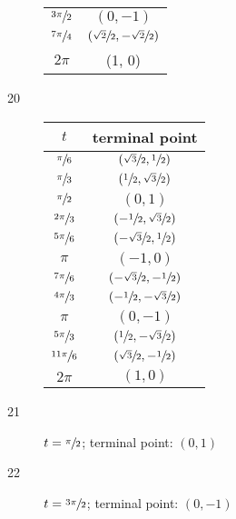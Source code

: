 \documentclass{exam}
\begin{document}
\begin{description}
\begin{tabular}{cc}
          $\sfrac{3 \pi}{2}$ & $\left( 0, -1 \right)$ \\
          $\sfrac{7 \pi}{4}$ & $\left( \sfrac{\sqrt{2}}{2}, -\sfrac{\sqrt{2}}{2} \right)$ \\
          $2 \pi$ & (1, 0) \\
          \bottomrule
        \end{tabular}

      \item[20]
        \begin{tabular}{cc}
          \toprule
          $t$ & terminal point \\
          \midrule
          $\sfrac{\pi}{6}$ & $\left( \sfrac{\sqrt{3}}{2}, \sfrac{1}{2} \right)$ \\
          $\sfrac{\pi}{3}$ & $\left( \sfrac{1}{2}, \sfrac{\sqrt{3}}{2} \right)$ \\

          \midrule
          $\sfrac{\pi}{2}$   & $(0, 1)$ \\
          $\sfrac{2 \pi}{3}$ & $\left( -\sfrac{1}{2}, \sfrac{\sqrt{3}}{2} \right)$ \\
          $\sfrac{5 \pi}{6}$ & $\left( -\sfrac{\sqrt{3}}{2}, \sfrac{1}{2} \right)$ \\

          \midrule
          $\pi$             & $(-1, 0)$ \\
          $\sfrac{7 \pi}{6}$ & $\left( -\sfrac{\sqrt{3}}{2}, -\sfrac{1}{2} \right)$ \\
          $\sfrac{4 \pi}{3}$ & $\left( -\sfrac{1}{2}, -\sfrac{\sqrt{3}}{2} \right)$ \\

          \midrule
          $\pi$              & $(0, -1)$ \\
          $\sfrac{5 \pi}{3}$  & $\left( \sfrac{1}{2}, -\sfrac{\sqrt{3}}{2} \right)$ \\
          $\sfrac{11 \pi}{6}$ & $\left( \sfrac{\sqrt{3}}{2}, -\sfrac{1}{2} \right)$ \\
          
          \midrule
          $2 \pi$             & $(1, 0)$ \\
          \bottomrule
        \end{tabular}

      \item[21] $t = \sfrac{\pi}{2}$; terminal point: $\boxed{ \left( 0, 1 \right) }$

      \item[22] $t = \sfrac{3 \pi}{2}$; terminal point: $\boxed{ \left( 0, -1 \right) }$


\end{description}
\end{document}
